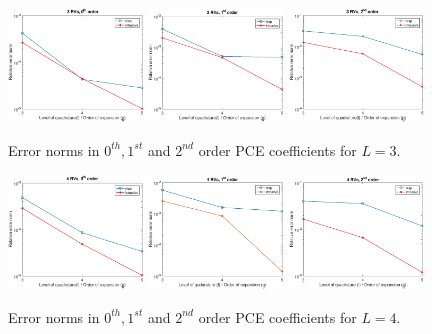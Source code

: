 \documentclass[letter,1p,11pt,oneside,onecolumn,sort&compress]{elsarticle}
\begin{document}
\begin{figure}[htbp]
\centering
 \includegraphics[width=0.32\textwidth,height=0.18\textheight]{plots/sigma04_3RN_u0_order0.eps}
 \includegraphics[width=0.32\textwidth,height=0.18\textheight]{plots/sigma04_3RN_u1_order1.eps}
 \includegraphics[width=0.32\textwidth,height=0.18\textheight]{plots/sigma04_3RN_u4_order2.eps}
 \caption{Error norms in $0^{th}, 1^{st}$ and $2^{nd}$ order PCE coefficients for $L=3$.}
 \label{fig:3RV}
\end{figure}
\begin{figure}[htbp]
\centering
 \includegraphics[width=0.32\textwidth,height=0.18\textheight]{plots/sigma04_4RN_u0_order0.eps}
 \includegraphics[width=0.32\textwidth,height=0.18\textheight]{plots/sigma04_4RN_u1_order1.eps}
 \includegraphics[width=0.32\textwidth,height=0.18\textheight]{plots/sigma04_4RN_u7_order2.eps}
 \caption{Error norms in $0^{th}, 1^{st}$ and $2^{nd}$ order PCE coefficients for $L=4$.}
 \label{fig:4RV}
\end{figure}
\end{document}
